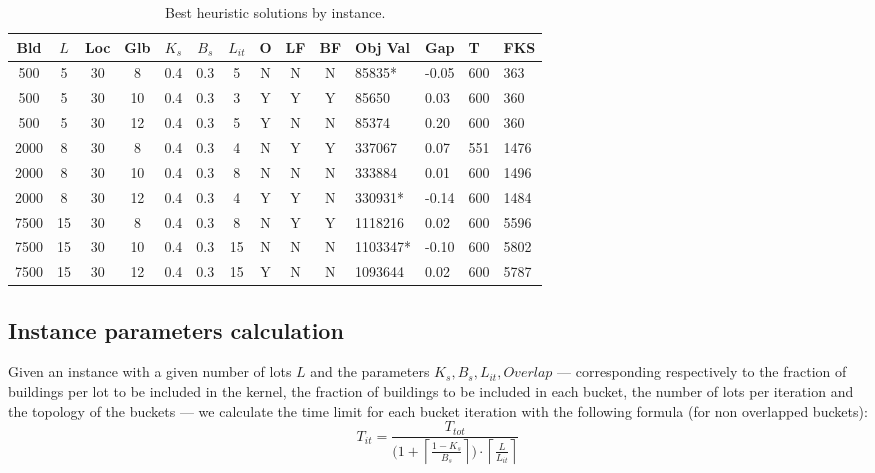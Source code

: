 \documentclass[a4paper, twocolumn, oneside, 10pt]{article}
\begin{document}
\begin{table*}[t]
	\centering
	\caption{Best heuristic solutions by instance.}\label{tab:best}
	\begin{tabular}{|ccccccccccllll|}
		\hline \footnotesize\textbf{Bld} & \footnotesize\textbf{\(L\)} & \footnotesize\textbf{Loc} & \footnotesize\textbf{Glb} & \footnotesize\textbf{\(K_s\)} & \footnotesize\textbf{\(B_s\)} & \footnotesize\textbf{\(L_{it}\)} & \footnotesize\textbf{O\footnotemark} & \footnotesize\textbf{LF\footnotemark} & \footnotesize\textbf{BF\footnotemark} & \footnotesize\textbf{Obj Val} & \footnotesize\textbf{Gap} & \footnotesize\textbf{T} & \footnotesize\textbf{FKS\footnotemark}\\
		\hline 
		500 & 5 & 30 & 8 & 0.4 & 0.3 & 5 & N & N & N & 85835* & -0.05 & 600 & 363\\
		500 & 5 & 30 & 10 & 0.4 & 0.3 & 3 & Y & Y & Y & 85650 & 0.03 & 600 & 360\\
		500 & 5 & 30 & 12 & 0.4 & 0.3 & 5 & Y & N & N & 85374 & 0.20 & 600 & 360\\
		2000 & 8 & 30 & 8 & 0.4 & 0.3 & 4 & N & Y & Y & 337067 & 0.07 & 551 & 1476\\
		2000 & 8 & 30 & 10 & 0.4 & 0.3 & 8 & N & N & N & 333884 & 0.01 & 600 & 1496\\
		2000 & 8 & 30 & 12 & 0.4 & 0.3 & 4 & Y & Y & N & 330931* & -0.14 & 600 & 1484\\
		7500 & 15 & 30 & 8 & 0.4 & 0.3 & 8 & N & Y & Y & 1118216 & 0.02 & 600 & 5596\\
		7500 & 15 & 30 & 10 & 0.4 & 0.3 & 15 & N & N & N & 1103347* & -0.10 & 600 & 5802\\
		7500 & 15 & 30 & 12 & 0.4 & 0.3 & 15 & Y & N & N & 1093644 & 0.02 & 600 & 5787\\
		\hline
	\end{tabular}
\end{table*}


\subsection{Instance parameters calculation}
Given an instance with a given number of lots \(L\) and the parameters \(K_s, B_s, L_{it}, Overlap\) --- corresponding respectively to the fraction of buildings per lot to be included in the kernel, the fraction of buildings to be included in each bucket, the number of lots per iteration and the topology of the buckets --- we calculate the time limit for each bucket iteration with the following formula (for non overlapped buckets):
\[
	T_{it} = \frac{T_{tot}}{\big( 1 + \left\lceil \frac{1-K_s}{B_s} \right\rceil \big) \cdot \left\lceil\frac{L}{L_{it}}\right\rceil}
\]
\end{document}

